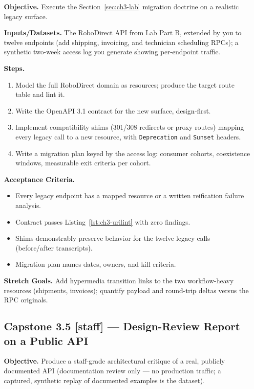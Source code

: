 \textbf{Objective.} Execute the Section~\ref{sec:ch3-lab} migration doctrine on
a realistic legacy surface.

\textbf{Inputs/Datasets.} The RoboDirect API from Lab Part B, extended by you to
twelve endpoints (add shipping, invoicing, and technician scheduling RPCs); a
synthetic two-week access log you generate showing per-endpoint traffic.

\textbf{Steps.}
\begin{enumerate}
  \item Model the full RoboDirect domain as resources; produce the target
        route table and lint it.
  \item Write the OpenAPI 3.1 contract for the new surface, design-first.
  \item Implement compatibility shims (301/308 redirects or proxy routes)
        mapping every legacy call to a new resource, with
        \texttt{Deprecation} and \texttt{Sunset} headers.
  \item Write a migration plan keyed by the access log: consumer cohorts,
        coexistence windows, measurable exit criteria per cohort.
\end{enumerate}

\textbf{Acceptance Criteria.}
\begin{itemize}
  \item[$\square$] Every legacy endpoint has a mapped resource or a written
        reification failure analysis.
  \item[$\square$] Contract passes Listing~\ref{lst:ch3-urilint} with zero
        findings.
  \item[$\square$] Shims demonstrably preserve behavior for the twelve legacy
        calls (before/after transcripts).
  \item[$\square$] Migration plan names dates, owners, and kill criteria.
\end{itemize}

\textbf{Stretch Goals.} Add hypermedia transition links to the two
workflow-heavy resources (shipments, invoices); quantify payload and
round-trip deltas versus the RPC originals.

\subsection{Capstone 3.5 [staff] --- Design-Review Report on a Public API}

\textbf{Objective.} Produce a staff-grade architectural critique of a real,
publicly documented API (documentation review only --- no production traffic;
a captured, synthetic replay of documented examples is the dataset).

